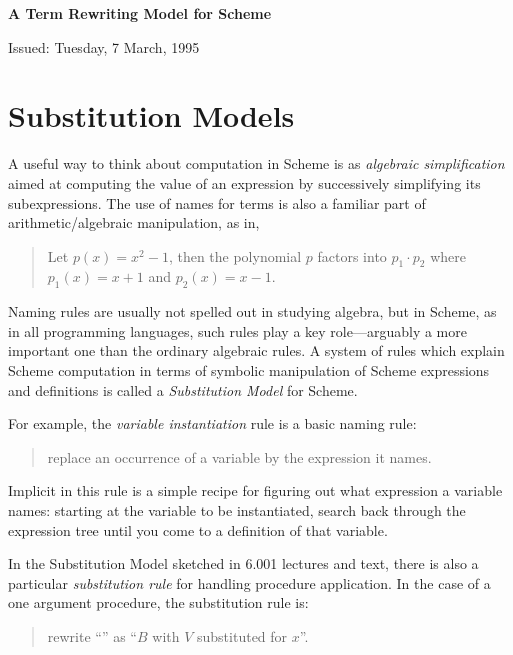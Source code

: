 \documentclass[11pt]{article}
\begin{document}
\begin{center}\large
{\bf A Term Rewriting Model for Scheme}
\end{center}

\medskip


\begin{flushleft}
Issued:  Tuesday, 7 March, 1995\\
\end{flushleft}

\section{Substitution Models}

A useful way to think about computation in Scheme is as {\em algebraic
  simplification\/} aimed at computing the value of an expression by
successively simplifying its subexpressions.  The use of names for terms
is also a familiar part of arithmetic/algebraic manipulation, as in,
\begin{quote}
Let $p(x) = x^{2}-1$, then the polynomial $p$ factors into
$p_{1}\cdot p_{2}$ where $p_{1}(x) = x + 1$ and $p_{2}(x) = x - 1$.
\end{quote}
Naming rules are usually not spelled out in studying algebra, but in
Scheme, as in all programming languages, such rules play a key
role---arguably a more important one than the ordinary algebraic rules.  A
system of rules which explain Scheme computation in terms of symbolic
manipulation of Scheme expressions and definitions is called a {\em
Substitution Model} for Scheme.

For example, the {\em variable instantiation} rule is a basic naming rule:
\begin{quote}
replace an occurrence of a variable by the expression it names.
\end{quote}
Implicit in this rule is a simple recipe for figuring out what expression
a variable names: starting at the variable to be instantiated, search back
through the expression tree until you come to a definition of that
variable.

In the Substitution Model sketched in 6.001 lectures and text, there is
also a particular {\em substitution rule} for handling procedure
application.  In the case of a one argument procedure, the substitution
rule is:
\begin{quote}
rewrite ``'' as ``$B$ with $V$ substituted
for $x$''.
\end{quote}
\end{document}
